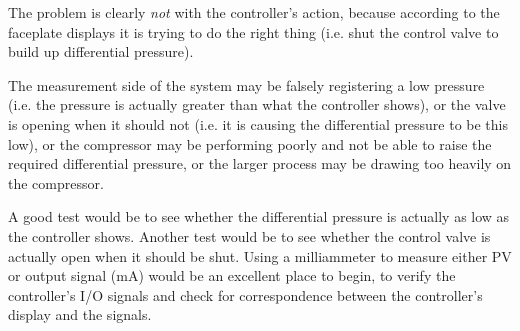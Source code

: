 
The problem is clearly {\it not} with the controller's action, because according to the faceplate displays it is trying to do the right thing (i.e. shut the control valve to build up differential pressure).







The measurement side of the system may be falsely registering a low pressure (i.e. the pressure is actually greater than what the controller shows), or the valve is opening when it should not (i.e. it is causing the differential pressure to be this low), or the compressor may be performing poorly and not be able to raise the required differential pressure, or the larger process may be drawing too heavily on the compressor.

\vskip 10pt

A good test would be to see whether the differential pressure is actually as low as the controller shows.  Another test would be to see whether the control valve is actually open when it should be shut.  Using a milliammeter to measure either PV or output signal (mA) would be an excellent place to begin, to verify the controller's I/O signals and check for correspondence between the controller's display and the signals.




